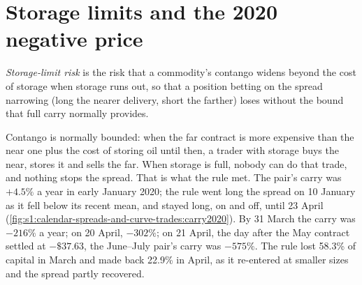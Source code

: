 \section{Storage limits and the 2020 negative price}

\begin{definition}\label{def:s1:calendar-spreads-and-curve-trades:storage}
\emph{Storage-limit risk} is the risk that a commodity's contango widens beyond the cost of storage when storage runs out, so
that a position betting on the spread narrowing (long the nearer delivery, short the farther) loses without the bound that full carry normally
provides.
\end{definition}

Contango is normally bounded: when the far contract is more expensive than the near one plus the cost of storing oil until then, a trader with storage
buys the near, stores it and sells the far. When storage is full, nobody can do that trade, and nothing stops the spread. That is what the rule met.
The pair's carry was $+4.5\%$ a year in early January 2020; the rule went long the spread on 10 January as it fell below its recent mean, and stayed
long, on and off, until 23 April (\cref{fig:s1:calendar-spreads-and-curve-trades:carry2020}). By 31 March the carry was $-216\%$ a year; on 20 April,
$-302\%$; on 21 April, the day after the May contract settled at $-\$37.63$, the June--July pair's carry was $-575\%$. The rule lost 58.3\% of capital in
March and made back 22.9\% in April, as it re-entered at smaller sizes and the spread partly recovered.

\begin{omfigure}

\label{fig:s1:calendar-spreads-and-curve-trades:carry2020}
\end{omfigure}


